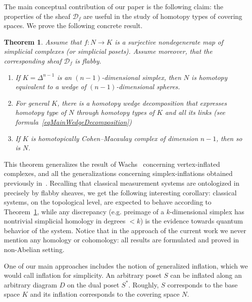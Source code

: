 \documentclass[english,12pt,oneside]{amsproc}
\newcommand{\ca}[1]{\mathcal{#1}}
\newcounter{stmcounter}[section]
\numberwithin{equation}{section}
\theoremstyle{plain}
\newtheorem{thm}[stmcounter]{Theorem}
\theoremstyle{definition}
\theoremstyle{remark}
\begin{document}
The main conceptual contribution of our paper is the following claim: the properties of the sheaf $\ca{D}_f$ are useful in the study of homotopy types of covering spaces. We prove the following concrete result.

\begin{thm}\label{thmMainIntro}
Assume that $f\colon N\to K$ is a surjective nondegenerate map of simplicial complexes (or simplicial posets). Assume moreover, that the corresponding sheaf $\ca{D}_f$ is flabby.
\begin{enumerate}
  \item If $K=\Delta^{n-1}$ is an $(n-1)$-dimensional simplex, then $N$ is homotopy equivalent to a wedge of $(n-1)$-dimensional spheres.
  \item For general $K$, there is a homotopy wedge decomposition that expresses homotopy type of $N$ through homotopy types of $K$ and all its links (see formula~\eqref{eqMainWedgeDecomposition})
  \item If $K$ is homotopically Cohen--Macaulay complex of dimension $n-1$, then so is $N$.
\end{enumerate}
\end{thm}

This theorem generalizes the result of Wachs~\cite{Wachs} concerning vertex-inflated complexes, and all the generalizations concerning simplex-inflations obtained previously in~\cite{AyzRukh}. Recalling that classical measurement systems are ontologized in~\cite{AbrBrand} precisely by flabby sheaves, we get the following interesting corollary: classical systems, on the topological level, are expected to behave according to Theorem~\ref{thmMainIntro}, while any discrepancy (e.g. preimage of a $k$-dimensional simplex has nontrivial simplicial homology in degrees $<k$) is the evidence towards quantum behavior of the system. Notice that in the approach of the current work we never mention any homology or cohomology: all results are formulated and proved in non-Abelian setting.

One of our main approaches includes the notion of generalized inflation, which we would call inflation for simplicity. An arbitrary poset $S$ can be inflated along an arbitrary diagram $D$ on the dual poset $S^*$. Roughly, $S$ corresponds to the base space $K$ and its inflation corresponds to the covering space $N$.
\end{document}
